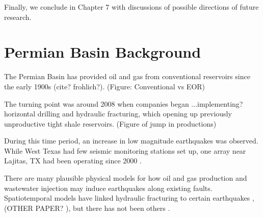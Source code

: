 \documentclass{utexasthesis}
\begin{document}
Finally, we conclude in Chapter 7 with discussions of possible directions of future research.







%
%
%
%
%
%
%
%



\chapter{Permian Basin Background}
\label{chap2}

The Permian Basin has provided oil and gas from conventional reservoirs since the early 1900s (cite? frohlich?).
(Figure: Conventional vs EOR)

The turning point was around 2008 when companies began ...implementing? horizontal drilling and hydraulic fracturing, which opening up previously unproductive tight shale reservoirs.
(Figure of jump in productions)


During this time period, an increase in low magnitude earthquakes was observed. While West Texas had few seismic monitoring stations set up, one array near Lajitas, TX had been operating since 2000 \cite{Frohlich2019OnsetCauseIncreased}.

There are many plausible physical models for how oil and gas production and wastewater injection may induce earthquakes along existing faults.
Spatiotemporal models have linked hydraulic fracturing to certain earthquakes \citep{Savvaidis2020InducedSeismicityDelaware}, (OTHER PAPER? ), but there has not been others .
\end{document}
